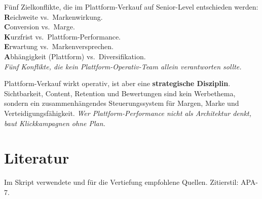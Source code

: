 \documentclass[11pt,a4paper,oneside]{article}
\newcommand{\caveatfontfallback}{\itshape}
\newcommand\caveatfont{\caveatfontfallback}%
\newcommand{\akzent}[1]{{\caveatfont\color{lpAmber}#1}}
\begin{document}
\begin{eselsbox}[Eselsbrücke: \akzent{R-C-K-E-A}]
Fünf Zielkonflikte, die im Plattform-Verkauf auf Senior-Level entschieden werden:\\[2pt]
\textbf{R}eichweite vs.\ Markenwirkung.\\
\textbf{C}onversion vs.\ Marge.\\
\textbf{K}urzfrist vs.\ Plattform-Performance.\\
\textbf{E}rwartung vs.\ Markenversprechen.\\
\textbf{A}bhängigkeit (Plattform) vs.\ Diversifikation.\\[2pt]
\emph{Fünf Konflikte, die kein Plattform-Operativ-Team allein verantworten sollte.}
\end{eselsbox}

\begin{merkbox}
Plattform-Verkauf wirkt operativ, ist aber eine \textbf{strategische Disziplin}. Sichtbarkeit, Content, Retention und Bewertungen sind kein Werbethema, sondern ein zusammenhängendes Steuerungssystem für Margen, Marke und Verteidigungsfähigkeit. \emph{Wer Plattform-Performance nicht als Architektur denkt, baut Klickkampagnen ohne Plan.}
\end{merkbox}

\clearpage
\section{Literatur}

Im Skript verwendete und für die Vertiefung empfohlene Quellen. Zitierstil: APA-7.
\end{document}
